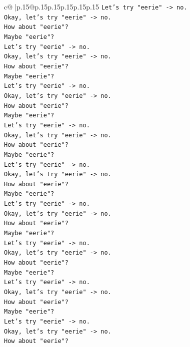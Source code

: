 \documentclass{article}
\begin{document}
{\begin{supertabular}{c@{$\;$}|p{.15\linewidth}@{}p{.15\linewidth}p{.15\linewidth}p{.15\linewidth}p{.15\linewidth}p{.15\linewidth}}
{{{\texttt{Let's try "eerie" {-}> no.} \\
\texttt{Okay, let's try "eerie" {-}> no.} \\
\texttt{How about "eerie"?} \\
\texttt{Maybe "eerie"?} \\
\texttt{Let's try "eerie" {-}> no.} \\
\texttt{Okay, let's try "eerie" {-}> no.} \\
\texttt{How about "eerie"?} \\
\texttt{Maybe "eerie"?} \\
\texttt{Let's try "eerie" {-}> no.} \\
\texttt{Okay, let's try "eerie" {-}> no.} \\
\texttt{How about "eerie"?} \\
\texttt{Maybe "eerie"?} \\
\texttt{Let's try "eerie" {-}> no.} \\
\texttt{Okay, let's try "eerie" {-}> no.} \\
\texttt{How about "eerie"?} \\
\texttt{Maybe "eerie"?} \\
\texttt{Let's try "eerie" {-}> no.} \\
\texttt{Okay, let's try "eerie" {-}> no.} \\
\texttt{How about "eerie"?} \\
\texttt{Maybe "eerie"?} \\
\texttt{Let's try "eerie" {-}> no.} \\
\texttt{Okay, let's try "eerie" {-}> no.} \\
\texttt{How about "eerie"?} \\
\texttt{Maybe "eerie"?} \\
\texttt{Let's try "eerie" {-}> no.} \\
\texttt{Okay, let's try "eerie" {-}> no.} \\
\texttt{How about "eerie"?} \\
\texttt{Maybe "eerie"?} \\
\texttt{Let's try "eerie" {-}> no.} \\
\texttt{Okay, let's try "eerie" {-}> no.} \\
\texttt{How about "eerie"?} \\
\texttt{Maybe "eerie"?} \\
\texttt{Let's try "eerie" {-}> no.} \\
\texttt{Okay, let's try "eerie" {-}> no.} \\
\texttt{How about "eerie"?} \\
}}}
\end{supertabular}}
\end{document}
